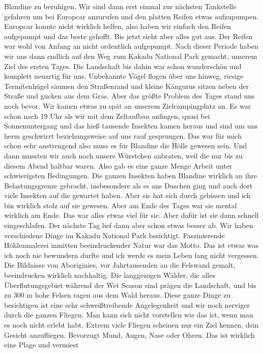 \documentclass[11pt]{book}
\begin{document}
Blandine zu beruhigen. Wir sind dann erst einmal zur nächsten Tankstelle gefahren um bei Europcar anzurufen und den platten Reifen 
etwas aufzupumpen. Europcar konnte nicht wirklich helfen, also haben wir einfach den Reifen aufgepumpt und das beste gehofft. Bis 
jetzt sieht aber alles gut aus. Der Reifen war wohl von Anfang an nicht ordentlich aufgepumpt. Nach dieser Periode haben wir 
uns dann endlich auf den Weg zum Kakadu National Park gemacht, unserem Ziel des ersten Tages. Die Landschaft bis dahin war schon 
wunderschön und komplett neuartig für uns. Unbekannte Vögel flogen über uns hinweg, riesige Termitenhügel säumen den Straßenrand 
und kleine Kängurus sitzen neben der Straße und gucken aus dem Gras. Aber das größte Problem des Tages stand uns noch bevor. 
Wir kamen etwas zu spät an unserem Zielcampingplatz an. Es war schon nach 19 Uhr als wir mit dem Zeltaufbau anfingen, quasi bei 
Sonnenuntergang und das hieß tausende Insekten kamen heraus und sind um uns herm geschwirrt beziehungsweise auf uns rauf gesprungen.
Das war für mich schon sehr anstrengend also muss es für Blandine die Hölle gewesen sein. Und dann mussten wir auch noch unsere 
Würstchen anbraten, weil die nur bis zu diesem Abend haltbar waren. Also gab es eine ganze Menge Arbeit unter schwierigsten Bedingungen.
Die ganzen Insekten haben Blandine wirklich an ihre Belastungsgrenze gebracht, insbesondere als es ans Duschen ging und auch dort 
viele Insekten auf die gewartet haben. Aber sie hat sich durch gebissen und ich bin wirklich stolz auf sie gewesen. Aber am Ende
des Tages war sie mental wirklich am Ende. Das war alles etwas viel für sie. Aber dafür ist sie dann schnell eingeschlafen. 
Der nächste Tag lief dann aber schon etwas besser ab. Wir haben verschiedene Dinge im Kakadu National Park besichtigt. Faszinierende 
Höhlenmalerei inmitten beeindruckender Natur war das Motto. Das ist etwas was ich noch nie bewundern durfte und ich werde es mein Leben 
lang nicht vergessen. Die Bildnisse von Aboriginies, vor Jahrtausenden an die Felswand gemalt, beeindrucken wirklich nachhaltig. 
Die langgezogen Wälder, die alles Überflutungsgebiet während der Wet Season sind prägen die Landschaft, und bis zu 300 m hohe Felsen 
ragen aus dem Wald heraus. Diese ganze Dinge zu besichtigen ist eine sehr schweißtreibende Angelegenheit und wir noch nerviger durch 
die ganzen Fliegen. Man kann sich nicht vorstellen wie das ist, wenn man es noch nicht erlebt habt. Extrem viele Fliegen scheinen 
nur ein Ziel kennen, dein Gesicht anzufliegen. Bevorzugt Mund, Augen, Nase oder Ohren. Das ist wirklich eine Plage und vermiest 
\end{document}
